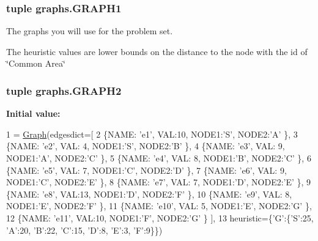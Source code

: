 \subsubsection[{G\+R\+A\+P\+H1}]{\setlength{\rightskip}{0pt plus 5cm}tuple graphs.\+G\+R\+A\+P\+H1}\label{namespacegraphs_a19f04d81ba0467a7f69415bcf71409db}


The graphs you will use for the problem set. 

The heuristic values are lower bounds on the distance to the node with the id of \char`\"{}\+Common Area\char`\"{} \hypertarget{namespacegraphs_ad5bc68c2b725ccc0c1ec6df745d605c8}{}
\subsubsection[{G\+R\+A\+P\+H2}]{\setlength{\rightskip}{0pt plus 5cm}tuple graphs.\+G\+R\+A\+P\+H2}\label{namespacegraphs_ad5bc68c2b725ccc0c1ec6df745d605c8}
{\bfseries Initial value\+:}
\begin{DoxyCode}
1 = \hyperlink{classsearch_1_1_graph}{Graph}(edgesdict=[ 
2         \{NAME: \textcolor{stringliteral}{'e1'},  VAL:10, NODE1:\textcolor{stringliteral}{'S'}, NODE2:\textcolor{stringliteral}{'A'} \},
3         \{NAME: \textcolor{stringliteral}{'e2'},  VAL: 4, NODE1:\textcolor{stringliteral}{'S'}, NODE2:\textcolor{stringliteral}{'B'} \},
4         \{NAME: \textcolor{stringliteral}{'e3'},  VAL: 9, NODE1:\textcolor{stringliteral}{'A'}, NODE2:\textcolor{stringliteral}{'C'} \},
5         \{NAME: \textcolor{stringliteral}{'e4'},  VAL: 8, NODE1:\textcolor{stringliteral}{'B'}, NODE2:\textcolor{stringliteral}{'C'} \},
6         \{NAME: \textcolor{stringliteral}{'e5'},  VAL: 7, NODE1:\textcolor{stringliteral}{'C'}, NODE2:\textcolor{stringliteral}{'D'} \},
7         \{NAME: \textcolor{stringliteral}{'e6'},  VAL: 9, NODE1:\textcolor{stringliteral}{'C'}, NODE2:\textcolor{stringliteral}{'E'} \},
8         \{NAME: \textcolor{stringliteral}{'e7'},  VAL: 7, NODE1:\textcolor{stringliteral}{'D'}, NODE2:\textcolor{stringliteral}{'E'} \},
9         \{NAME: \textcolor{stringliteral}{'e8'},  VAL:13, NODE1:\textcolor{stringliteral}{'D'}, NODE2:\textcolor{stringliteral}{'F'} \},
10         \{NAME: \textcolor{stringliteral}{'e9'},  VAL: 8, NODE1:\textcolor{stringliteral}{'E'}, NODE2:\textcolor{stringliteral}{'F'} \},
11         \{NAME: \textcolor{stringliteral}{'e10'}, VAL: 5, NODE1:\textcolor{stringliteral}{'E'}, NODE2:\textcolor{stringliteral}{'G'} \},
12         \{NAME: \textcolor{stringliteral}{'e11'}, VAL:10, NODE1:\textcolor{stringliteral}{'F'}, NODE2:\textcolor{stringliteral}{'G'} \} ],
13                heuristic=\{\textcolor{stringliteral}{'G'}:\{\textcolor{stringliteral}{'S'}:25, \textcolor{stringliteral}{'A'}:20, \textcolor{stringliteral}{'B'}:22, \textcolor{stringliteral}{'C'}:15, \textcolor{stringliteral}{'D'}:8, \textcolor{stringliteral}{'E'}:3, \textcolor{stringliteral}{'F'}:9\}\})
\end{DoxyCode}
\hypertarget{namespacegraphs_ae1928e75cd53a1fe3a92fe7b5519ba68}{}
